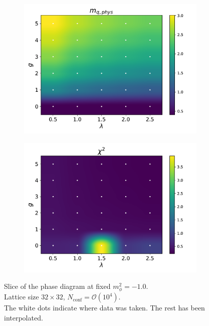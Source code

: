 \begin{figure}[htp]
\begin{subfigure}[b]{0.47\textwidth}
        \includegraphics[width=\textwidth]{figures/phase_diagram/g-lam/phase_diagram_mqphys.pdf}
    \end{subfigure}
    \begin{subfigure}[b]{0.47\textwidth}
        \includegraphics[width=\textwidth]{figures/phase_diagram/g-lam/phase_diagram_chi2.pdf}
    \end{subfigure}
    \caption{Slice of the phase diagram at fixed $m_\phi^2 = -1.0$. \\ Lattice size $32 \times 32$, $N_\text{conf} = \mathcal{O}(10^4)$. \\ The white dots indicate where data was taken. The rest has been interpolated.}
    \label{fig:phase_diagram_g_lam}
\end{figure} \newpage
